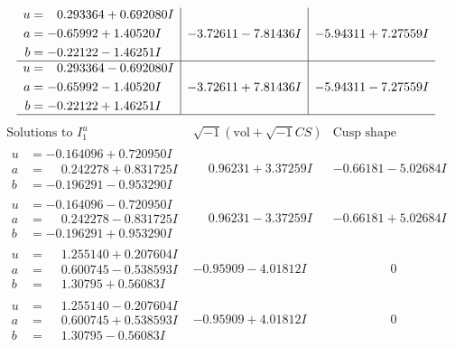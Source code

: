 \documentclass[1p]{elsarticle_modified}
\theoremstyle{definition}
\newcommand{\I}{\sqrt{-1}}
\begin{document}
$$\begin{array}{c|c|c}
\begin{aligned}
u &= \phantom{-}0.293364 + 0.692080 I \\
a &= -0.65992 + 1.40520 I \\
b &= -0.22122 - 1.46251 I\end{aligned}
 & -3.72611 - 7.81436 I & -5.94311 + 7.27559 I \\ \hline\begin{aligned}
u &= \phantom{-}0.293364 - 0.692080 I \\
a &= -0.65992 - 1.40520 I \\
b &= -0.22122 + 1.46251 I\end{aligned}
 & -3.72611 + 7.81436 I & -5.94311 - 7.27559 I\\
 \hline 
 \end{array}$$\newpage$$\begin{array}{c|c|c}  
\text{Solutions to }I^u_{1}& \I (\text{vol} + \sqrt{-1}CS) & \text{Cusp shape}\\
 \hline 
\begin{aligned}
u &= -0.164096 + 0.720950 I \\
a &= \phantom{-}0.242278 + 0.831725 I \\
b &= -0.196291 - 0.953290 I\end{aligned}
 & \phantom{-}0.96231 + 3.37259 I & -0.66181 - 5.02684 I \\ \hline\begin{aligned}
u &= -0.164096 - 0.720950 I \\
a &= \phantom{-}0.242278 - 0.831725 I \\
b &= -0.196291 + 0.953290 I\end{aligned}
 & \phantom{-}0.96231 - 3.37259 I & -0.66181 + 5.02684 I \\ \hline\begin{aligned}
u &= \phantom{-}1.255140 + 0.207604 I \\
a &= \phantom{-}0.600745 - 0.538593 I \\
b &= \phantom{-}1.30795 + 0.56083 I\end{aligned}
 & -0.95909 - 4.01812 I & \phantom{-0.000000 } 0 \\ \hline\begin{aligned}
u &= \phantom{-}1.255140 - 0.207604 I \\
a &= \phantom{-}0.600745 + 0.538593 I \\
b &= \phantom{-}1.30795 - 0.56083 I\end{aligned}
 & -0.95909 + 4.01812 I & \phantom{-0.000000 } 0 \\ \hline\begin{aligned}

\end{aligned}
\end{array}$$
\end{document}
